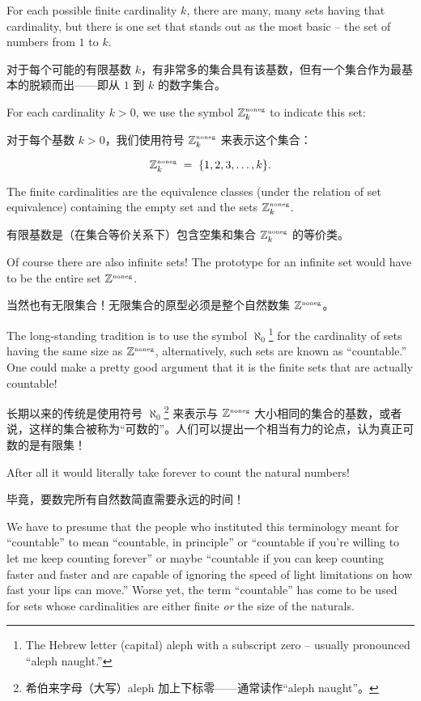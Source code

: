 For each possible finite cardinality $k$, there are many, many sets having
that cardinality, but there is one set that stands out as the most basic -- the
set of numbers from $1$ to $k$.

对于每个可能的有限基数 $k$，有非常多的集合具有该基数，但有一个集合作为最基本的脱颖而出——即从 $1$ 到 $k$ 的数字集合。

For each cardinality $k > 0$, we use the symbol
${\mathbb Z}^{\mbox{\tiny noneg}}_k$ to indicate this set:

对于每个基数 $k > 0$，我们使用符号 ${\mathbb Z}^{\mbox{\tiny noneg}}_k$ 来表示这个集合：

\[ {\mathbb Z}^{\mbox{\tiny noneg}}_k \; = \;
    \{1, 2, 3, \ldots , k\}. \]

The finite cardinalities are the equivalence classes (under the relation of
set equivalence) containing the empty set and the sets ${\mathbb Z}^{\mbox{\tiny noneg}}_k$.

有限基数是（在集合等价关系下）包含空集和集合 ${\mathbb Z}^{\mbox{\tiny noneg}}_k$ 的等价类。

Of course there
are also infinite sets!  The prototype for an infinite set would have to be
the entire set ${\mathbb Z}^{\mbox{\tiny noneg}}$.

当然也有无限集合！无限集合的原型必须是整个自然数集 ${\mathbb Z}^{\mbox{\tiny noneg}}$。

The long-standing tradition is to use the
symbol 
$\aleph_0$\footnote{The Hebrew letter (capital) aleph with a %
    subscript zero -- usually pronounced ``aleph naught.''}
for the cardinality
of sets having the same size as ${\mathbb Z}^{\mbox{\tiny noneg}}$, alternatively, such sets
are known as ``countable.''  One could make a pretty good argument that
it is the finite sets that are actually countable!

长期以来的传统是使用符号  $\aleph_0$\footnote{希伯来字母（大写）aleph 加上下标零——通常读作“aleph naught”。} 来表示与 ${\mathbb Z}^{\mbox{\tiny noneg}}$ 大小相同的集合的基数，或者说，这样的集合被称为“可数的”。人们可以提出一个相当有力的论点，认为真正可数的是有限集！

After all it would literally take forever to count the natural numbers!

毕竟，要数完所有自然数简直需要永远的时间！

We have to presume that the
people who instituted
this terminology meant for ``countable'' to mean ``countable, in principle''
or ``countable if you're willing to let me keep counting forever'' or maybe
``countable if you can keep counting faster and faster and are capable of
ignoring the speed of light limitations on how fast your lips can move.''  Worse
yet, the term ``countable'' has come to be used for sets whose cardinalities are
either finite \emph{or} the size of the naturals.

